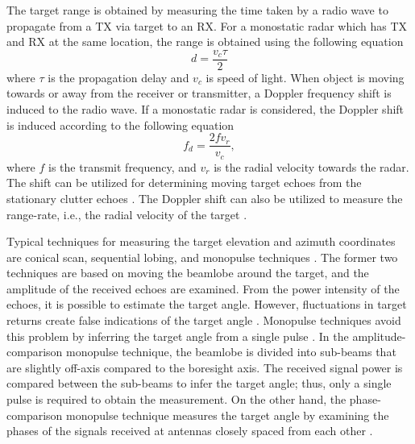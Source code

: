 \documentclass[english, 12pt, a4paper, elec, utf8, a-1b, online]{aaltothesis}
\numberwithin{equation}{section}
\begin{document}
The target range is obtained by measuring the time taken by a radio wave to propagate from a TX via target to an RX.
For a monostatic radar which has TX and RX at the same location, the range is obtained using the following equation \cite{Curry2011}
\begin{equation}
\label{eq:target_range}
    d = \frac{ v_c \tau}{2} 
\end{equation}
where $\tau$ is the propagation delay and $v_c$ is speed of light.
When object is moving towards or away from the receiver or transmitter, a Doppler frequency shift is induced to the radio wave.
If a monostatic radar is considered, the Doppler shift is induced  according to the following equation \cite{Curry2011}
\begin{equation}
\label{eq:doppler_freq}
    f_d = \frac{2 f v_r}{v_c},
\end{equation}
where $f$ is the transmit frequency, and $v_r$ is the radial velocity towards the radar.
The shift can be utilized for determining moving target echoes from the stationary clutter echoes \cite{Curry2011}.
The Doppler shift can also be utilized to measure the range-rate, i.e., the radial velocity of the target \cite{Curry2011}.

Typical techniques for measuring the target elevation and azimuth coordinates are conical scan, sequential lobing, and monopulse techniques \cite{Sherman2011}. 
The former two techniques are based on moving the beamlobe around the target, and the amplitude of the received echoes are examined. 
From the power intensity of the echoes, it is possible to estimate the target angle.
However, fluctuations in target returns create false indications of the target angle \cite{Sherman2011}.
Monopulse techniques avoid this problem by inferring the target angle from a single pulse \cite{Sherman2011}.
In the amplitude-comparison monopulse technique, the beamlobe is divided into sub-beams that are slightly off-axis compared to the boresight axis.  
The received signal power is compared between the sub-beams to infer the target angle; thus, only a single pulse is required to obtain the measurement.
On the other hand, the phase-comparison monopulse technique measures the target angle by examining the phases of the signals received at antennas closely spaced from each other \cite{Sherman2011}.
\end{document}

